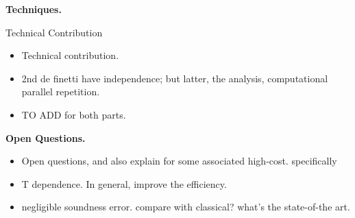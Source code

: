 %


\vspace{2mm} \noindent \textbf{Techniques.}


Technical Contribution
\begin{itemize}
    \item Technical contribution. 
    \item 2nd de finetti have independence; but latter, the analysis, computational parallel repetition. 
    \item TO ADD for both parts. 
\end{itemize}

\vspace{2mm} \noindent \textbf{Open Questions.}
\begin{itemize}
    \item Open questions, and also explain for some associated high-cost. specifically 
    \item T dependence. In general, improve the efficiency.  
    \item negligible soundness error.  compare with classical? what's the state-of-the art. 
\end{itemize}


